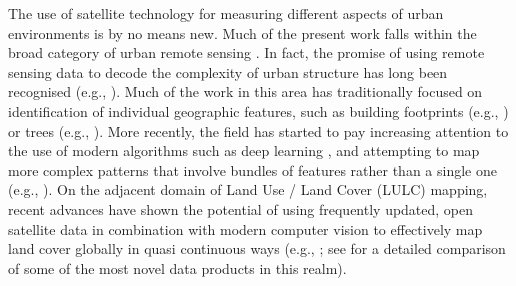 The use of satellite technology for measuring different aspects of urban
environments is by no means new.
Much of the present work falls within the
broad category of urban remote sensing \citep{rashed2010remote, weng2018urban,
yang2021urban}. In fact, the promise of using remote sensing data to decode
the complexity of urban structure has long been recognised (e.g.,
\citealp{longley2002geographical}).
Much of the work in this area has traditionally focused on identification of
individual geographic features, such as building footprints (e.g.,
\citealp{microsoft2019}) or trees (e.g., \citealp{ke2011review}). More
recently, the field has started to pay increasing attention to the use of
modern algorithms such as deep learning \citep{lai2021deep}, and attempting to
map more complex patterns that involve bundles of features rather than a single
one (e.g., \citealp{kuffer2021mapping}).
On the adjacent domain of Land Use / Land Cover (LULC) mapping, recent advances
have shown the potential of using frequently updated, open satellite data in
combination with modern computer vision to effectively map land cover globally
in quasi continuous ways
(e.g., \citealp{karra2021global, brown2022dynamic}; see \citealp{venter2022global} for a
detailed comparison of some of the most novel data products in this realm).

